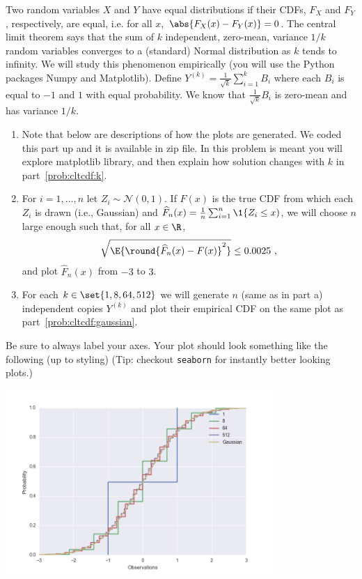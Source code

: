 \documentclass{article}
\begin{document}
\begin{aprob}
     Two random variables $X$ and $Y$ have equal  distributions if their CDFs, $F_X$ and $F_Y$, respectively, are equal, i.e. for all $x$, $ \abs{F_X(x) - F_Y(x)} = 0$. 
    The central limit theorem says that the sum of $k$ independent, zero-mean, variance $1/k$ random variables converges to a (standard) Normal distribution as $k$ tends to infinity.  
    We will study this phenomenon empirically (you will use the Python packages Numpy and Matplotlib). 
    Define $Y^{(k)} = \frac{1}{\sqrt{k}} \sum_{i=1}^k B_i$ where each $B_i$ is equal to $-1$ and $1$ with equal probability.
    We know that $\frac{1}{\sqrt{k}} B_i$ is zero-mean and has variance $1/k$.
    \begin{enumerate}
    \item Note that below are descriptions of how the plots are generated. We coded this part up and it is available in zip file. In this problem is meant you will explore matplotlib library, and then explain how solution changes with $k$ in part~\ref{prob:cltcdf:k}.
    \item \label{prob:cltcdf:gaussian} For $i=1,\ldots,n$ let $Z_i \sim \mathcal{N}(0,1)$. If $F(x)$ is the true CDF from which each $Z_i$ is drawn (i.e.,  Gaussian) and $\widehat{F}_n(x) = \frac{1}{n} \sum_{i=1}^n \1\{ Z_i \leq x)$, we will choose $n$ large enough such that, for all $x \in \R$,
    \[
    	\sqrt{\E{\round{\widehat{F}_n(x)-F(x)}^2 }} \leq 0.0025\ ,
    \]
    and plot $\widehat{F}_n(x)$ from $-3$ to $3$.
    
    \item \label{prob:cltcdf:k} For each $k \in \set{1, 8, 64, 512}$ we will generate $n$ (same as in part a) independent copies $Y^{(k)}$ and plot their empirical CDF on the same plot as part~\ref{prob:cltcdf:gaussian}.
    \end{enumerate}
    Be sure to always label your axes. 
    Your plot should look something like the following (up to styling) (Tip: checkout \texttt{seaborn} for instantly better looking plots.)

    \begin{center}
        \includegraphics[width=4in]{full.png}
    \end{center}
    

\end{aprob}
\end{document}
